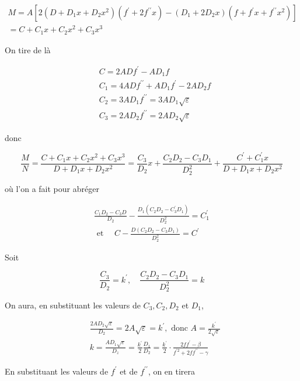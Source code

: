 \documentclass{article}
\begin{document}
\[
\begin{gathered}
M=A\left[2\left(D+D_{1} x+D_{2} x^{2}\right)\left(f^{\prime}+2 f^{\prime \prime} x\right)-\left(D_{1}+2 D_{2} x\right)\left(f+f^{\prime} x+f^{\prime \prime} x^{2}\right)\right] \\
=C+C_{1} x+C_{2} x^{2}+C_{3} x^{3}
\end{gathered}
\]

On tire de là

\[
\begin{aligned}
& C=2 A D f^{\prime}-A D_{1} f \\
& C_{1}=4 A D f^{\prime \prime}+A D_{1} f^{\prime}-2 A D_{2} f \\
& C_{2}=3 A D_{1} f^{\prime \prime}=3 A D_{1} \sqrt{\varepsilon} \\
& C_{3}=2 A D_{2} f^{\prime \prime}=2 A D_{2} \sqrt{\varepsilon}
\end{aligned}
\]

donc

\[
\frac{M}{N}=\frac{C+C_{1} x+C_{2} x^{2}+C_{3} x^{3}}{D+D_{1} x+D_{2} x^{2}}=\frac{C_{3}}{D_{2}} x+\frac{C_{2} D_{2}-C_{3} D_{1}}{D_{2}^{2}}+\frac{C^{\prime}+C_{1}^{\prime} x}{D+D_{1} x+D_{2} x^{2}}
\]

où l'on a fait pour abréger

\[
\begin{gathered}
\frac{C_{1} D_{2}-C_{3} D}{D_{2}}-\frac{D_{1}\left(C_{2} D_{2}-C_{3}^{\prime} D_{1}\right)}{D_{2}^{2}}=C_{1}^{\prime} \\
\text { et } \quad C-\frac{D\left(C_{2} D_{2}-C_{3} D_{1}\right)}{D_{2}^{2}}=C^{\prime}
\end{gathered}
\]

Soit

\[
\frac{C_{3}}{D_{2}}=k^{\prime}, \quad \frac{C_{2} D_{2}-C_{3} D_{1}}{D_{2}^{2}}=k
\]

On aura, en substituant les valeurs de \(C_{3}, C_{2}, D_{2}\) et \(D_{1}\),

\[
\begin{aligned}
& \frac{2 A D_{2} \sqrt{\varepsilon}}{D_{2}}=2 A \sqrt{\varepsilon}=k^{\prime}, \text { donc } A=\frac{k^{\prime}}{2 \sqrt{\varepsilon}} \\
& k=\frac{A D_{1} \sqrt{\varepsilon}}{D_{z}}=\frac{k^{\prime}}{2} \frac{D_{1}}{D_{2}}=\frac{k^{\prime}}{2} \cdot \frac{2 f f^{\prime}-\beta}{f^{\prime 2}+2 f f^{\prime \prime}-\gamma}
\end{aligned}
\]

En substituant les valeurs de \(f^{\prime}\) et de \(f^{\prime \prime}\), on en tirera
\end{document}
